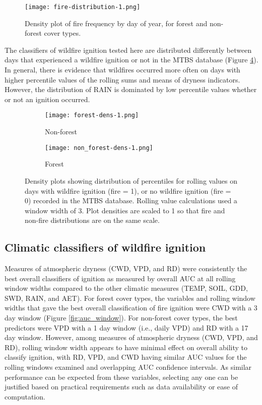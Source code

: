 \documentclass[11p]{article}
\begin{document}
\begin{figure}[htbp]
  \texttt{[image: fire-distribution-1.png]}
  \caption{Density plot of fire frequency by day of year, for forest and non-forest cover types.}
  \label{fig:fire-dens}
\end{figure}

The classifiers of wildfire ignition tested here are distributed differently between days that experienced a wildfire ignition or not in the MTBS database (Figure \ref{fig:dens}). In general, there is evidence that wildfires occurred more often on days with higher percentile values of the rolling sums and means of dryness indicators. However, the distribution of RAIN is dominated by low percentile values whether or not an ignition occurred.  

\begin{figure}[htbp]
  \centering
  \begin{subfigure}{.5\textwidth}
    \centering
    \texttt{[image: forest-dens-1.png]}
    \caption{Non-forest}
    \label{fig:dens-nf}
  \end{subfigure}%
  \begin{subfigure}{.5\textwidth}
    \centering
    \texttt{[image: non\_forest-dens-1.png]}
    \caption{Forest}
    \label{fig:dens-f}
  \end{subfigure}
  \caption{Density plots showing distribution of percentiles for rolling values on days with wildfire ignition (fire = 1), or no wildfire ignition (fire = 0) recorded in the MTBS database. Rolling value calculations used a window width of 3. Plot densities are scaled to 1 so that fire and non-fire distributions are on the same scale.}
  \label{fig:dens}
\end{figure}

\subsection{Climatic classifiers of wildfire ignition}

Measures of atmospheric dryness (CWD, VPD, and RD) were consistently the best overall classifiers of ignition as measured by overall AUC at all rolling window widths compared to the other climatic measures (TEMP, SOIL, GDD, SWD, RAIN, and AET).  For forest cover types, the variables and rolling window widths that gave the best overall classification of fire ignition were CWD with a 3 day window (Figure \ref{fig:auc_window}).  For non-forest cover types, the best predictors were VPD with a 1 day window (i.e., daily VPD) and RD with a 17 day window.  However, among measures of atmospheric dryness (CWD, VPD, and RD), rolling window width appears to have minimal effect on overall ability to classify ignition, with RD, VPD, and CWD having similar AUC values for the rolling windows examined and overlapping AUC confidence intervals.  As similar performance can be expected from these variables, selecting any one can be justified based on practical requirements such as data availability or ease of computation.
\end{document}
